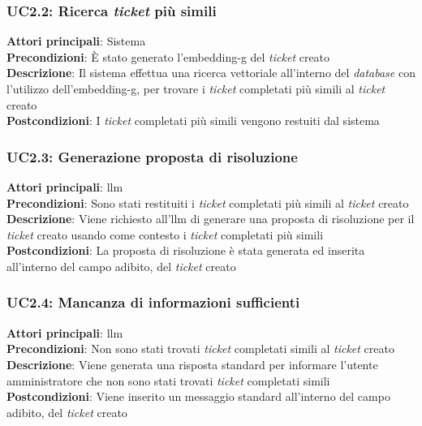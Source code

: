 \subsubsection{UC2.2: Ricerca \textit{ticket} più simili}
\textbf{Attori principali}: Sistema \\ 
\textbf{Precondizioni}: È stato generato l'\gls{embedding-g} del \textit{ticket} creato\\
\textbf{Descrizione}: Il sistema effettua una ricerca vettoriale all'interno del \textit{database} con l'utilizzo dell'\gls{embedding-g}, per trovare i \textit{ticket} completati più simili al \textit{ticket} creato \\
\textbf{Postcondizioni}: I \textit{ticket} completati più simili vengono restuiti dal sistema \\

\subsubsection{UC2.3: Generazione proposta di risoluzione}
\textbf{Attori principali}: \gls{llm} \\
\textbf{Precondizioni}: Sono stati restituiti i \textit{ticket} completati più simili al \textit{ticket} creato \\
\textbf{Descrizione}: Viene richiesto all'\gls{llm} di generare una proposta di risoluzione per il \textit{ticket} creato usando come contesto i \textit{ticket} completati più simili \\
\textbf{Postcondizioni}: La proposta di risoluzione è stata generata ed inserita all'interno del campo adibito, del \textit{ticket} creato \\

\subsubsection{UC2.4: Mancanza di informazioni sufficienti}
\textbf{Attori principali}: \gls{llm} \\
\textbf{Precondizioni}: Non sono stati trovati \textit{ticket} completati simili al \textit{ticket} creato \\
\textbf{Descrizione}: Viene generata una risposta standard per informare l'utente amministratore che non sono stati trovati \textit{ticket} completati simili \\
\textbf{Postcondizioni}: Viene inserito un messaggio standard all'interno del campo adibito, del \textit{ticket} creato \\

